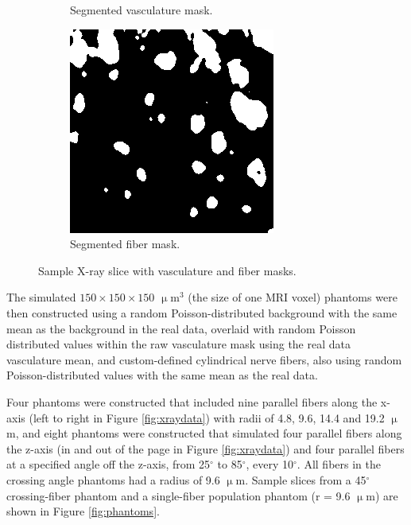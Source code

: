 \documentclass[11pt]{article}
\begin{document}
\begin{figure}[h]
\begin{subfigure}[b]{0.3\textwidth}
    \caption{Segmented vasculature mask.}
    \label{fig:vascmasc}
  \end{subfigure}
  \hspace{1em}
  \begin{subfigure}[b]{0.3\textwidth}
    \centering
    \includegraphics[width=0.9\linewidth]{figs/fibmask84}
    \caption{Segmented fiber mask.}
    \label{fig:fibmask}
  \end{subfigure}
  \caption{Sample X-ray slice with vasculature and fiber masks.}
  \label{fig:xrayslice}
\end{figure}

The simulated $150\times150\times150$ $\upmu$m$^3$ (the size of one MRI voxel)
phantoms were then constructed using a random Poisson-distributed background
with the same mean as the background in the real data, overlaid with random
Poisson distributed values within the raw vasculature mask using the real data
vasculature mean, and custom-defined cylindrical nerve fibers, also using random
Poisson-distributed values with the same mean as the real data.

Four phantoms were constructed that included nine parallel fibers along the
x-axis (left to right in Figure \ref{fig:xraydata}) with radii of 4.8, 9.6, 14.4
and 19.2 $\upmu$m, and eight phantoms were constructed that simulated four
parallel fibers along the z-axis (in and out of the page in Figure
\ref{fig:xraydata}) and four parallel fibers at a specified angle off the
z-axis, from 25$^{\circ}$ to 85$^{\circ}$, every 10$^{\circ}$. All fibers in the
crossing angle phantoms had a radius of 9.6 $\upmu$m. Sample slices from a
45$^{\circ}$ crossing-fiber phantom and a single-fiber population phantom (r =
9.6 $\upmu$m) are shown in Figure \ref{fig:phantoms}.
\end{document}
